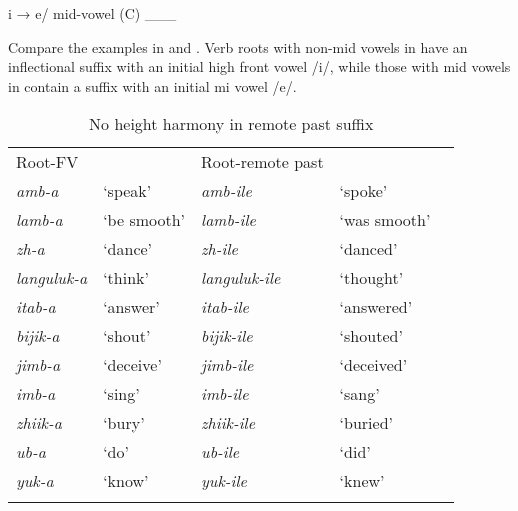 \documentclass[output=paper]{langsci/langscibook}
\begin{document}
\ea
\label{ex:2.kawasha}
i → e/ mid-vowel (C) \_\_\_

\z

Compare the examples in  and . Verb roots with non-mid vowels in  have an inflectional suffix with an initial high front vowel /i/, while those with mid vowels in  contain a suffix with an initial mi vowel /e/. 

\begin{table}
\begin{tabular}{lllll}
\lsptoprule
Root-FV & & Root-remote past & & \\
\textit{amb-a} & ‘speak’ & \textit{amb-ile} & ‘spoke’ & \\
\textit{lamb-a} & ‘be smooth’ & \textit{lamb-ile} & ‘was smooth’ & \\
\textit{zh-a} & ‘dance’ & \textit{zh-ile} & ‘danced’ & \\
\textit{languluk-a } & ‘think’ &\textit{languluk-ile} & ‘thought’ & \\
\textit{itab-a } & ‘answer’ &\textit{itab-ile } & ‘answered’ & \\
\textit{bijik-a } & ‘shout’ & \textit{bijik-ile } & ‘shouted’ & \\
\textit{jimb-a } & ‘deceive’ & \textit{jimb-ile } & ‘deceived’ & \\
\textit{imb-a } & ‘sing’ & \textit{imb-ile } & ‘sang’ & \\
\textit{zhiik-a } & ‘bury’ & \textit{zhiik-ile } & ‘buried’ & \\
\textit{ub-a } & ‘do’ & \textit{ub-ile } & ‘did’ & \\
\textit{yuk-a } & ‘know’ &\textit{yuk-ile } & ‘knew’ & \\
\lspbottomrule
\end{tabular}

\caption{No height harmony in remote past suffix}
\label{tab:2.kawasha}

 \end{table}
\end{document}

